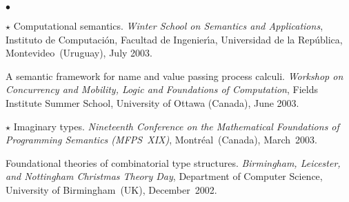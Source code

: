 \documentclass[11pt,twocolumn]{article}
\newenvironment{mybigitemize}
  {\begin{list}{$\bullet$}
  {\setlength{\topsep}{2pt}
   \setlength{\partopsep}{2pt}
   \setlength{\itemsep}{2.5pt}
   \setlength{\parsep}{2.5pt}
   \setlength{\leftmargin}{1em}
   \setlength{\labelwidth}{.5em}}}
  {\end{list}}
\begin{document}
\begin{mybigitemize}
\item[$\star$]
  Computational semantics.  \emph{Winter School on Semantics and
    Applications}, Instituto de Computaci\'on, Facultad de Ingenier\'{\i}a,
  Universidad de la Rep\'ublica, Montevideo~(Uruguay), July 2003.

\item
  A semantic framework for name and value passing process calculi.
  \emph{Workshop on Concurrency and Mobility, Logic and Foundations of
    Computation}, Fields Institute Summer School, University of Ottawa
  (Canada), June 2003.

\item[$\star$]
  Imaginary types.  \emph{Nineteenth Conference on the Mathematical
    Foundations of Programming Semantics (MFPS~XIX)}, Montr\'eal~(Canada),
  March~2003.

\item
  Foundational theories of combinatorial type structures.  \emph{Birmingham,
    Leicester, and Nottingham Christmas Theory Day}, Department of Computer
  Science, University of Birmingham~(UK), December~2002.
\end{mybigitemize}
\vspace*{-6mm}
\end{document}
